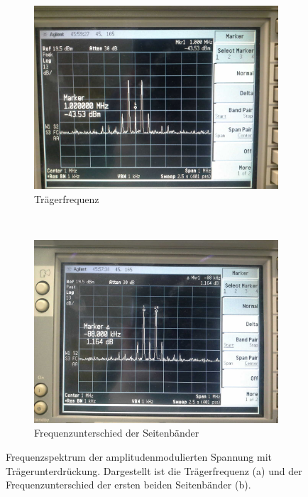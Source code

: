\FloatBarrier
\begin{figure}
	\begin{subfigure}[t]{0.5\textwidth}
		\centering
		\includegraphics[scale=0.17]{../Grafiken/Frequenzspektrum_b_AmpModuliertTraegerunterdrueckung_0.jpg}
		\caption{Trägerfrequenz\label{fig:frequenzspektrum_b_ampmodulierttraegerunterdrueckung_0}}
	\end{subfigure}%
	~
	\begin{subfigure}[t]{0.5\textwidth}
		\centering
		\includegraphics[scale=0.17]{../Grafiken/Frequenzspektrum_b_AmpModuliertTraegerunterdrueckung_1.jpg}
		\caption{Frequenzunterschied der Seitenbänder \label{fig:frequenzspektrum_b_ampmodulierttraegerunterdrueckung_1}}
	\end{subfigure}
	\caption{Frequenzspektrum der amplitudenmodulierten Spannung mit Trägerunterdrückung. Dargestellt ist 
		die Trägerfrequenz (a) und der Frequenzunterschied der ersten beiden Seitenbänder (b).
		\label{fig:frequenzspektrum_b_ampmodulierttraegerunterdrueckung}}
\end{figure}
\FloatBarrier